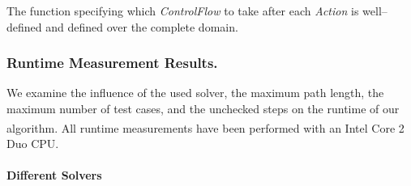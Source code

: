 \documentclass[runningheads,a4paper]{llncs}%
\newcommand{\UMLType}[1]{\textsf{\textit{#1}}} %
\begin{document}
The function specifying which \UMLType{ControlFlow} to take after each
\UMLType{Action} is well--defined and defined over the complete domain.

\subsubsection{Runtime Measurement Results.}
We examine the influence of the used solver, the maximum path length, the
maximum number of test cases, and the unchecked steps on the runtime of our
algorithm. All runtime measurements have been performed with an
Intel\textsuperscript{\textregistered} Core\textsuperscript{\texttrademark} 2
Duo CPU.%
\paragraph{Different Solvers}%
\end{document}
